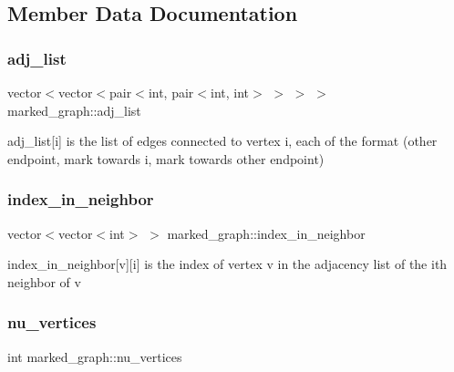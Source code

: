 \subsection{Member Data Documentation}
\mbox{\label{classmarked__graph_a1a0bf7ca413a278763f7c878b3b6fd6f}} 
\subsubsection{\texorpdfstring{adj\+\_\+list}{adj\_list}}
{\footnotesize\ttfamily vector$<$vector$<$pair$<$int, pair$<$int, int$>$ $>$ $>$ $>$ marked\+\_\+graph\+::adj\+\_\+list}



adj\+\_\+list\mbox{[}i\mbox{]} is the list of edges connected to vertex i, each of the format (other endpoint, mark towards i, mark towards other endpoint) 

\mbox{\label{classmarked__graph_aee10b537408de42476609c1e45c075d0}} 
\subsubsection{\texorpdfstring{index\+\_\+in\+\_\+neighbor}{index\_in\_neighbor}}
{\footnotesize\ttfamily vector$<$vector$<$int$>$ $>$ marked\+\_\+graph\+::index\+\_\+in\+\_\+neighbor}



index\+\_\+in\+\_\+neighbor\mbox{[}v\mbox{]}\mbox{[}i\mbox{]} is the index of vertex v in the adjacency list of the ith neighbor of v 

\mbox{\label{classmarked__graph_acf79c6aeb8f32614cb14a5baaa6c9f9b}} 
\subsubsection{\texorpdfstring{nu\+\_\+vertices}{nu\_vertices}}
{\footnotesize\ttfamily int marked\+\_\+graph\+::nu\+\_\+vertices}



